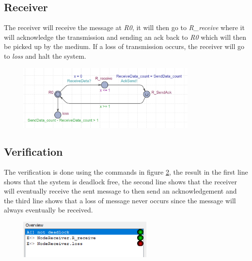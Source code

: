     \subsection*{Receiver}
    The receiver will receive the message at \textit{R0}, it will then go to \textit{R\_receive} where it will acknowledge the transmission and sending an ack back to \textit{R0} which will then be picked up by the medium. If a loss of transmission occurs, the receiver will go to \textit{loss} and halt the system.

    \begin{figure}[H]
        \centering
        \includegraphics[width=0.8\textwidth]{images/Receiver.png}
        \caption{}
        \label{fig:receiver}    
    \end{figure}

    \subsection*{Verification}
    The verification is done using the commands in figure \ref{fig:verify}, the result in the first line shows that the system is deadlock free, the second line shows that the receiver will eventually receive the sent message to then send an acknowledgement and the third line shows that a loss of message never occurs since the message will always eventually be received.
    
    \begin{figure}[H]
        \centering
        \includegraphics[width=0.6\textwidth]{images/Verify.png}
        \caption{}
        \label{fig:verify}    
    \end{figure}